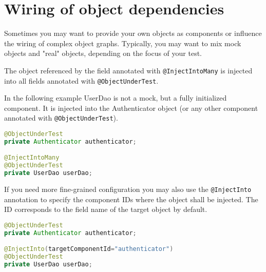 \section{Wiring of object dependencies}
\label{sec:Wiring of object dependencies}

Sometimes you may want to provide your own objects as components or influence the wiring of complex object graphs. Typically, you may want to mix
mock objects and "real" objects, depending on the focus of your test.

The object referenced by the field annotated with \verb|@InjectIntoMany| is injected into all fields annotated with \verb|@ObjectUnderTest|.

In the following example UserDao is not a mock, but a fully initialized component. It is injected into the Authenticator object (or any other
component annotated with \verb|@ObjectUnderTest|). 

\begin{lstlisting}[language={JAVA},caption=InjectIntoMany]
@ObjectUnderTest
private Authenticator authenticator;

@InjectIntoMany
@ObjectUnderTest
private UserDao userDao;
\end{lstlisting}

If you need more fine-grained configuration you may also use the \verb|@InjectInto| annotation to specify the component IDs where the object 
shall be injected.
The ID corresponds to the field name of the target object by default.

\begin{lstlisting}[language={JAVA},caption=InjectInto]
@ObjectUnderTest
private Authenticator authenticator;

@InjectInto(targetComponentId="authenticator")
@ObjectUnderTest
private UserDao userDao;
\end{lstlisting}





